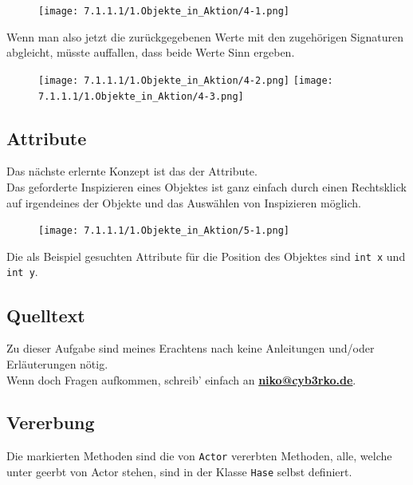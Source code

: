 \documentclass{scrartcl}   %
\begin{document}
\begin{figure}[ht]
	\centering
	\texttt{[image: 7.1.1.1/1.Objekte\_in\_Aktion/4-1.png]}
\end{figure}

Wenn man also jetzt die zurückgegebenen Werte mit den zugehörigen Signaturen abgleicht, müsste auffallen, dass beide Werte Sinn ergeben.

\newpage

\begin{figure}[ht]
	\centering
	\texttt{[image: 7.1.1.1/1.Objekte\_in\_Aktion/4-2.png]}
	\hspace{0.5cm}
	\texttt{[image: 7.1.1.1/1.Objekte\_in\_Aktion/4-3.png]}
\end{figure}

\subsection{Attribute}
Das nächste erlernte Konzept ist das der Attribute.\\
Das geforderte Inspizieren eines Objektes ist ganz einfach durch einen Rechtsklick auf irgendeines der Objekte und das Auswählen von \glqq Inspizieren\grqq{} möglich.

\begin{figure}[ht]
	\centering
	\texttt{[image: 7.1.1.1/1.Objekte\_in\_Aktion/5-1.png]}
\end{figure}

Die als Beispiel gesuchten Attribute für die Position des Objektes sind \texttt{int x} und \texttt{int y}.

\newpage

\subsection{Quelltext}
Zu dieser Aufgabe sind meines Erachtens nach keine Anleitungen und/oder Erläuterungen nötig.\\
Wenn doch Fragen aufkommen, schreib' einfach an \textbf{\href{mailto:niko@cyb3rko.de}{niko@cyb3rko.de}}.

\subsection{Vererbung}

Die markierten Methoden sind die von \texttt{Actor} vererbten Methoden, alle, welche unter \glqq geerbt von Actor\grqq{} stehen, sind in der Klasse \texttt{Hase} selbst definiert.\\
\end{document}

